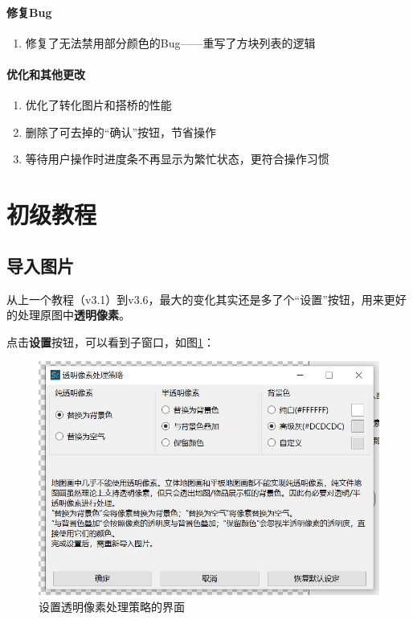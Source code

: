 \documentclass[UTF8]{ctexart}
\begin{document}
    \paragraph{修复Bug}
    \begin{enumerate}
        \item 修复了无法禁用部分颜色的Bug——重写了方块列表的逻辑 
    \end{enumerate}
    \paragraph{优化和其他更改}
    \begin{enumerate}        
        \item 优化了转化图片和搭桥的性能
        \item 删除了可去掉的“确认”按钮，节省操作
        \item 等待用户操作时进度条不再显示为繁忙状态，更符合操作习惯
    \end{enumerate}

    \pagebreak
    \section{初级教程}
    \subsection{导入图片}
    从上一个教程（v3.1）到v3.6，最大的变化其实还是多了个“设置”按钮，用来更好的处理原图中\textbf{透明像素}。
 
    点击\textbf{设置}按钮，可以看到子窗口，如图\ref*{SetTPS}：

    \begin{figure}[htbp]
        \centering
        \includegraphics[width=15cm]{Img1_TPS.png}
        \caption{设置透明像素处理策略的界面}
        \label{SetTPS}
    \end{figure}
    
\end{document}
